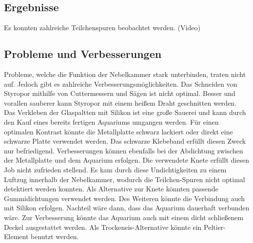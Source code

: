 \subsection{Ergebnisse}
Es konnten zahlreiche Teilchenspuren beobachtet werden. (Video)

\subsection{Probleme und Verbesserungen}
Probleme, welche die Funktion der Nebelkammer stark unterbinden, traten nicht
auf. Jedoch gibt es zahlreiche Verbesserungsmöglichkeiten. Das Schneiden von
Styropor mithilfe von Cuttermessern und Sägen ist nicht optimal. Besser und
vorallen sauberer kann Styropor mit einem heißem Draht geschnitten werden. Das
Verkleben der Glaspaltten mit Silikon ist eine große Sauerei und kann durch den
Kauf eines bereits fertigen Aquariums umgangen werden. Für einen optimalen
Kontrast könnte die Metallplatte schwarz lackiert oder direkt eine schwarze
Platte verwendet werden. Das schwarze Klebeband erfüllt diesen Zweck nur
befriedigend. Verbesserungen können ebenfalls bei der Abdichtung zwischen der
Metallplatte und dem Aquarium erfolgen. Die verwendete Knete erfüllt diesen Job
nicht zufrieden stellend. Es kam durch diese Undichtigkeiten zu einem Luftzug
innerhalb der Nebelkammer, wodurch die Teilchen-Spuren nicht optimal detektiert
werden konnten. Als Alternative zur Knete könnten passende Gummidichtungen
verwendet werden. Des Weiteren könnte die Verbindung auch mit Silikon erfolgen.
Nachteil wäre dann, dass das Aquarium dauerhaft verbunden wäre. Zur Verbesserung
könnte das Aquarium auch mit einem dicht schließenem Deckel ausgestattet werden.
Als Trockeneis-Alternative könnte ein Peltier-Element benutzt werden.




